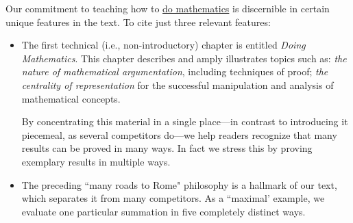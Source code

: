 \documentclass{article}[12pt]
\begin{document}
\noindent
Our commitment to teaching how to \underline{do mathematics} is discernible in certain unique features in the text.  To cite just three relevant features:
  \begin{itemize}
  \item
The first technical (i.e., non-introductory) chapter is entitled {\em Doing Mathematics}.  This chapter describes and amply illustrates topics such as: {\em the nature of mathematical argumentation}, including techniques of proof; {\em the centrality of representation} for the successful manipulation and analysis of mathematical concepts.

\smallskip

By concentrating this material in a single place---in contrast to introducing it piecemeal, as several competitors do---we help readers recognize that many results can be proved in many ways.  In fact we stress this by proving exemplary results in multiple ways.

 \item
The preceding ``many roads to Rome" philosophy is a hallmark of our text, which separates it from many competitors.  As a ``maximal' example, we evaluate one particular summation in five completely distinct ways. 



\end{itemize}
\end{document}
